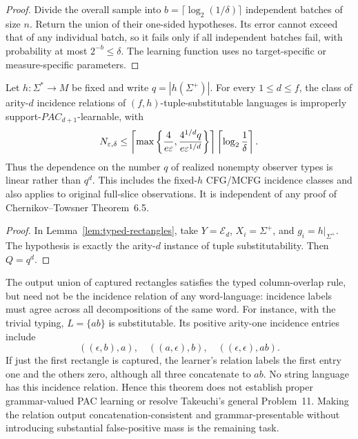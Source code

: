 \begin{proof}
Divide the overall sample into
\(b=\lceil\log_2(1/\delta)\rceil\)
independent batches of size \(n\).
Return the union of their one-sided hypotheses.
Its error cannot exceed that of any individual
batch, so it fails only if all independent
batches fail, with probability at most
\(2^{-b}\le\delta\).  The learning function
uses no target-specific or measure-specific
parameters.
\end{proof}

\begin{corollary}
\label{cor:fixed-h-improper-pac}
Let \(h:\Sigma^*\to M\) be fixed and write
\(q=|h(\Sigma^+)|\).  For every \(1\le d\le f\),
the class of arity-\(d\) incidence relations of
\((f,h)\)-tuple-substitutable languages is
improperly support-\(PAC_{d+1}\)-learnable,
with
\[
 N_{\varepsilon,\delta}\le
 \left\lceil
 \max\left\{
 \frac{4}{e\varepsilon},
 \frac{4^{1/d}q}{e\varepsilon^{1/d}}
 \right\}
 \right\rceil
 \left\lceil\log_2\frac1\delta\right\rceil.
\]
Thus the dependence on the number \(q\) of realized
nonempty observer types is linear rather than \(q^d\).
This includes the fixed-\(h\) CFG/MCFG incidence
classes and also applies to original full-slice
observations.  It is independent of any proof
of Chernikov--Towsner Theorem~6.5.
\end{corollary}
\begin{proof}
In Lemma~\ref{lem:typed-rectangles}, take
\(Y=\mathcal E_d\), \(X_i=\Sigma^+\),
and \(g_i=h|_{\Sigma^+}\).  The hypothesis is
exactly the arity-\(d\) instance of
tuple substitutability.  Then \(Q=q^d\).
\end{proof}

\begin{remark}
\label{rem:improper-not-incidence}
The output union of captured rectangles satisfies
the typed column-overlap rule, but need not
be the incidence relation of any word-language:
incidence labels must agree across all decompositions
of the same word.  For instance, with the
trivial typing, \(L=\{ab\}\) is substitutable.
Its positive arity-one incidence entries include
\[
 ((\epsilon,b),a),\quad
 ((a,\epsilon),b),\quad
 ((\epsilon,\epsilon),ab).
\]
If just the first rectangle is captured, the
learner's relation labels the first entry one
and the others zero, although all three
concatenate to \(ab\).  No string language has
this incidence relation.  Hence this theorem
does not establish proper grammar-valued
PAC learning or resolve Takeuchi's general
Problem~11.  Making the relation output
concatenation-consistent and grammar-presentable
without introducing substantial false-positive
mass is the remaining task.
\end{remark}


